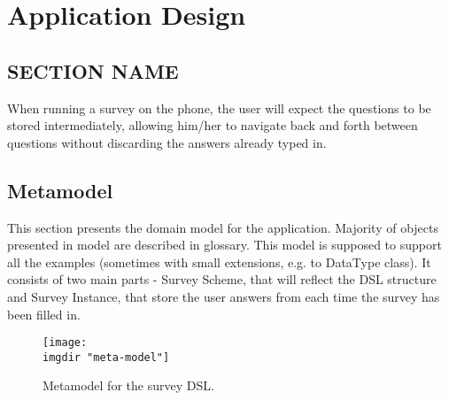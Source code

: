 \chapter{Application Design}
\label{chap:design}

\section{SECTION NAME}
\label{sec:}
When running a survey on the phone, the user will expect the questions to be stored intermediately, allowing him/her to navigate back and forth between questions without discarding the answers already typed in.


\section{Metamodel}
\label{sec:metamodel}
This section presents the domain model for the application. Majority of objects presented in model are described in glossary. This model is supposed to support all the examples (sometimes with small extensions, e.g. to DataType class). It consists of two main parts - Survey Scheme, that will reflect the DSL structure and Survey Instance, that store the user answers from each time the survey has been filled in.

\begin{figure}
  \texttt{[image: \\imgdir "meta-model"]}
  \caption{Metamodel for the survey DSL.}
  \label{fig:metamodel}
\end{figure}

